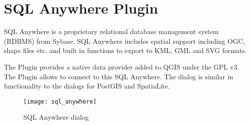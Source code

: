 
\section{SQL Anywhere Plugin}\label{sec:sqlanywhere}

\updatedisclaimer

SQL Anywhere is a proprietary relational database management system (RDBMS) 
from Sybase. SQL Anywhere includes spatial support including OGC, shape files 
etc. and built in functions to export to KML, GML and SVG formats.

The  Plugin provides a native data provider 
added to QGIS under the GPL v3. The Plugin allows to connect to this SQL 
Anywhere. The  dialog is similar in functionality 
to the dialogs for PostGIS and SpatiaLite.

\begin{figure}[ht]
   \centering
   \texttt{[image: sql\_anywhere]}
   \caption{SQL Anywhere dialog \nixcaption}
   \label{fig:sqlanywhere}
\end{figure}


\FloatBarrier
